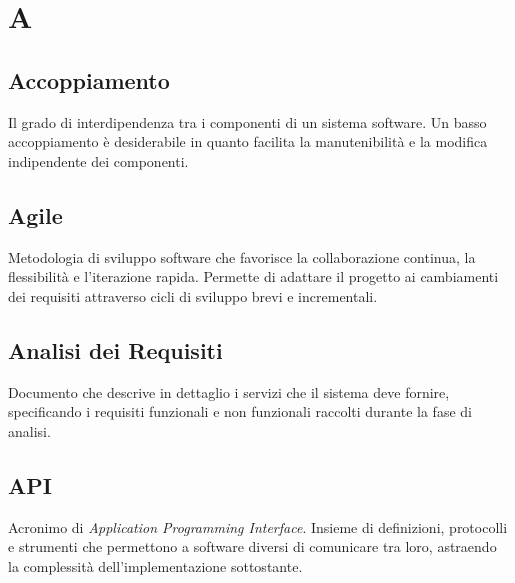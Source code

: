 \documentclass[a4paper, 11pt, oneside]{scrartcl} %
\begin{document}
\newpage
\appendix


\section*{A}


\subsection*{Accoppiamento}


Il grado di interdipendenza tra i componenti di un sistema software. Un basso accoppiamento è desiderabile in quanto facilita la manutenibilità e la modifica indipendente dei componenti.

\vspace{0.5cm}

\subsection*{Agile}


Metodologia di sviluppo software che favorisce la collaborazione continua, la flessibilità e l'iterazione rapida. Permette di adattare il progetto ai cambiamenti dei requisiti attraverso cicli di sviluppo brevi e incrementali.

\vspace{0.5cm}

\subsection*{Analisi dei Requisiti}


Documento che descrive in dettaglio i servizi che il sistema deve fornire, specificando i requisiti funzionali e non funzionali raccolti durante la fase di analisi.

\vspace{0.5cm}

\subsection*{API}
Acronimo di \textit{Application Programming Interface}. Insieme di definizioni, protocolli e strumenti che permettono a software diversi di comunicare tra loro, astraendo la complessità dell'implementazione sottostante.
\vspace{0.5cm}
\end{document}

